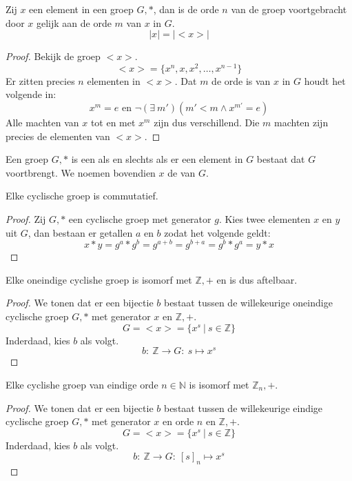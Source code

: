 \documentclass[main.tex]{subfiles}
\begin{document}
\begin{st}
  \label{st:orde-van-generator-is-orde-van-groep}
  Zij $x$ een element in een groep $G,*$, dan is de orde $n$ van de groep voortgebracht door $x$ gelijk aan de orde $m$ van $x$ in $G$.
  \[ |x| = |<x>| \]

  \begin{proof}
    Bekijk de groep $<x>$.
    \[ <x> = \{ x^{n}, x,x^{2},\dotsc,x^{n-1}\} \]
    Er zitten precies $n$ elementen in $<x>$.
    Dat $m$ de orde is van $x$ in $G$ houdt het volgende in:
    \[ x^{m} = e \text{ en } \neg (\exists\ m')(m'<m \wedge x^{m'} = e) \]
    Alle machten van $x$ tot en met $x^{m}$ zijn dus verschillend.
    Die $m$ machten zijn precies de elementen van $<x>$.
  \end{proof}
\end{st}
 
\begin{de}
  \label{de:cyclische-groep}
  Een groep $G,*$ is een  als en slechts als er een element in $G$ bestaat dat $G$ voortbrengt.
  We noemen bovendien $x$ de  van $G$.
\end{de}

\begin{st}
  \label{st:cyclishe-groep-is-commutatief}
  Elke cyclische groep is commutatief.

  \begin{proof}
    Zij $G,*$ een cyclische groep met generator $g$.
    Kies twee elementen $x$ en $y$ uit $G$, dan bestaan er getallen $a$ en $b$ zodat het volgende geldt:
    \[ x * y = g^{a} * g^{b} = g^{a+b} = g^{b+a} = g^{b} * g^{a} = y * x \]
  \end{proof}
\end{st}

\begin{ei}
  Elke oneindige cyclishe groep is isomorf met $\mathbb{Z},+$ en is dus aftelbaar.

  \begin{proof}
    We tonen dat er een bijectie $b$ bestaat tussen de willekeurige oneindige cyclische groep $G,*$ met generator $x$ en $\mathbb{Z},+$.
    \[ G = <x> = \{ x^{s}\ |\ s \in \mathbb{Z} \} \]
    Inderdaad, kies $b$ als volgt.
    \[ b:\ \mathbb{Z} \rightarrow G:\ s \mapsto x^{s} \]
  \end{proof}
\end{ei}

\begin{ei}
  Elke cyclishe groep van eindige orde $n \in \mathbb{N}$ is isomorf met $\mathbb{Z}_{n},+$.

  \begin{proof}
    We tonen dat er een bijectie $b$ bestaat tussen de willekeurige eindige cyclische groep $G,*$ met generator $x$ en orde $n$ en $\mathbb{Z},+$.
    \[ G = <x> = \{ x^{s}\ |\ s \in \mathbb{Z} \} \]
    Inderdaad, kies $b$ als volgt.
    \[ b:\ \mathbb{Z} \rightarrow G:\ [s]_{n} \mapsto x^{s} \]
  \end{proof}
\end{ei}
\end{document}
